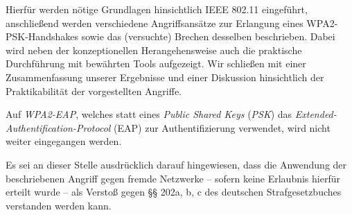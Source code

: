 Hierfür werden nötige Grundlagen hinsichtlich IEEE 802.11 eingeführt, anschließend werden verschiedene Angriffsansätze zur Erlangung eines WPA2-PSK-Handshakes sowie das (versuchte) Brechen desselben beschrieben. 
Dabei wird neben der konzeptionellen Herangehensweise auch die praktische Durchführung mit bewährten Tools aufgezeigt. 
Wir schließen mit einer Zusammenfassung unserer Ergebnisse und einer Diskussion hinsichtlich der Praktikabilität der vorgestellten Angriffe.

Auf \textit{WPA2-EAP}, welches statt eines \textit{Public Shared Keys} (\textit{PSK}) das \textit{Extended-Authentification-Protocol} (EAP) zur Authentifizierung verwendet, wird nicht weiter eingegangen werden.

Es sei an dieser Stelle ausdrücklich darauf hingewiesen, dass die Anwendung der beschriebenen Angriff gegen fremde Netzwerke -- sofern keine Erlaubnis hierfür erteilt wurde -- als Verstoß gegen §§ 202a, b, c des deutschen Strafgesetzbuches verstanden werden kann.
